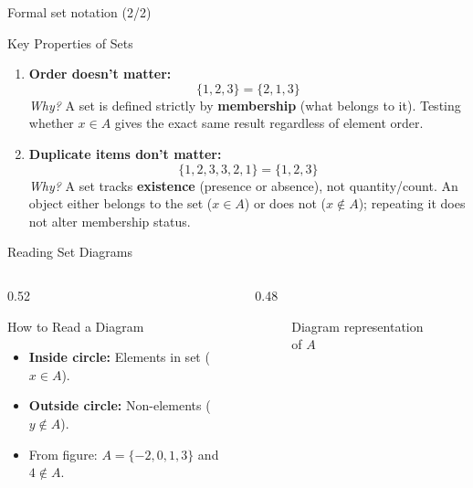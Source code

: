 \begin{frame}{Formal set notation (2/2)}
\begin{block}{Key Properties of Sets}
\begin{enumerate}
\item \textbf{Order doesn't matter:}
\[ \{1, 2, 3\} = \{2, 1, 3\} \]
\textit{Why?} A set is defined strictly by \textbf{membership} (what belongs to it). Testing whether $x \in A$ gives the exact same result regardless of element order. 

\item \textbf{Duplicate items don't matter:}
\[ \{1, 2, 3, 3, 2, 1\} = \{1, 2, 3\} \]
\textit{Why?} A set tracks \textbf{existence} (presence or absence), not quantity/count. An object either belongs to the set ($x \in A$) or does not ($x \notin A$); repeating it does not alter membership status.
\end{enumerate}
\end{block}
\end{frame}

\begin{frame}{Reading Set Diagrams}
\begin{columns}
\begin{column}{0.52\textwidth}
\begin{block}{How to Read a Diagram}
\begin{itemize}
\item \textbf{Inside circle:} Elements in set ($x \in A$).
\item \textbf{Outside circle:} Non-elements ($y \notin A$).
\item From figure: $A = \{-2, 0, 1, 3\}$ and $4 \notin A$.
\end{itemize}
\end{block}
\end{column}
\begin{column}{0.48\textwidth}
\begin{figure}[h!]
\centering
{}
\caption{Diagram representation of $A$}
\end{figure}
\end{column}
\end{columns}
\end{frame}

